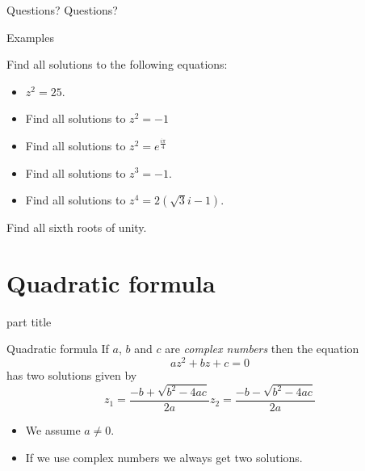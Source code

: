 \documentclass{beamer}
\begin{document}
\begin{frame}{Questions?}
Questions?
\end{frame}

\begin{frame}{Examples}
\begin{example}
Find all solutions to the following equations:
\begin{itemize}
	\item $z^2 = 25$. %
	\item Find all solutions to $z^2 = -1$ %
	\item Find all solutions to $z^2 = e^{\frac{i\pi}{4}}$ %
	\item Find all solutions to $z^3 = -1$.
	\item Find all solutions to $z^4 = 2(\sqrt{3}i-1)$. %
\end{itemize}
\end{example}
\begin{example}
Find all sixth roots of unity.
\end{example}
\end{frame}

\section{Quadratic formula}

\begin{frame}
\begin{beamercolorbox}[sep=12pt,center]{part title}
\insertsection\par
\end{beamercolorbox}
\end{frame}

\begin{frame}{Quadratic formula}
If $a$, $b$ and $c$ are \emph{complex numbers} then the equation
\begin{equation*}
az^2+bz+c = 0
\end{equation*}
has two solutions given by
\begin{equation*}
	z_1 = \frac{-b+\sqrt{b^2-4ac}}{2a} z_2 = \frac{-b-\sqrt{b^2-4ac}}{2a}
\end{equation*}
\begin{itemize}
	\item We assume $a\neq 0$.
	\item If we use complex numbers we always get two solutions.
\end{itemize}
\end{frame}
\end{document}
